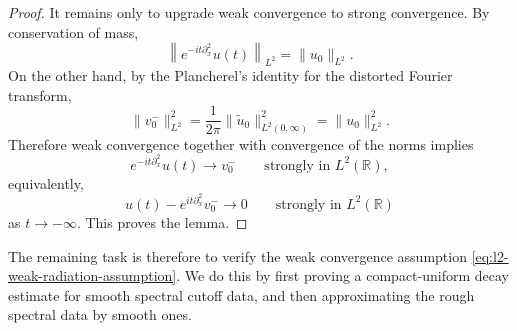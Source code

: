 \documentclass[10pt]{article}
\numberwithin{equation}{section}
\numberwithin{theorem}{section}
\begin{document}
\begin{proof}
It remains only to upgrade weak convergence to strong convergence. By conservation of
mass,
\[
\left\|e^{-it\partial_x^2}u(t)\right\|_{L^2}
=
\|u_0\|_{L^2}.
\]
On the other hand, by the Plancherel's identity for the distorted Fourier transform,
\[
\|v_0^-\|_{L^2}^2
=
\frac1{2\pi}
\|\widetilde u_0\|_{L^2(0,\infty)}^2
=
\|u_0\|_{L^2}^2.
\]
Therefore weak convergence together with convergence of the norms implies
\[
e^{-it\partial_x^2}u(t)
\longrightarrow
v_0^-
\qquad\text{strongly in }L^2(\mathbb R),
\]
equivalently,
\[
u(t)-e^{it\partial_x^2}v_0^-
\longrightarrow0
\qquad\text{strongly in }L^2(\mathbb R)
\]
as \(t\to-\infty\). This proves the lemma.
\end{proof}
The remaining task is therefore to verify the weak convergence assumption
\eqref{eq:l2-weak-radiation-assumption}. We do this by first proving a compact-uniform decay estimate for smooth
spectral cutoff data, and then approximating the rough spectral data by smooth ones.
\end{document}
